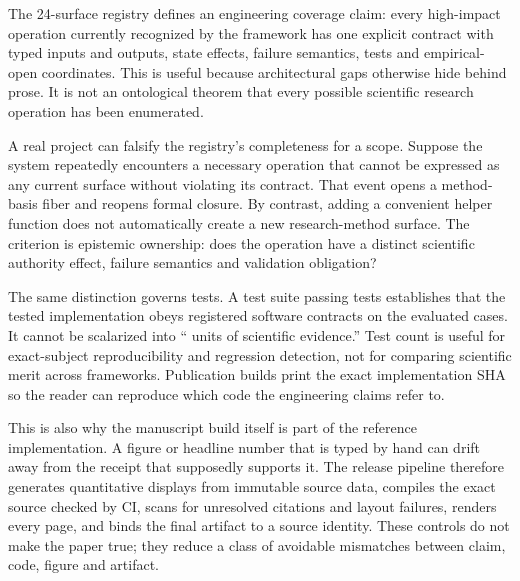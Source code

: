 The 24-surface registry defines an engineering coverage claim: every high-impact operation currently recognized by the framework has one explicit contract with typed inputs and outputs, state effects, failure semantics, tests and empirical-open coordinates. This is useful because architectural gaps otherwise hide behind prose. It is not an ontological theorem that every possible scientific research operation has been enumerated.

A real project can falsify the registry's completeness for a scope. Suppose the system repeatedly encounters a necessary operation that cannot be expressed as any current surface without violating its contract. That event opens a method-basis fiber and reopens formal closure. By contrast, adding a convenient helper function does not automatically create a new research-method surface. The criterion is epistemic ownership: does the operation have a distinct scientific authority effect, failure semantics and validation obligation?

The same distinction governs tests. A test suite passing \SoftwareTests{} tests establishes that the tested implementation obeys registered software contracts on the evaluated cases. It cannot be scalarized into ``\SoftwareTests{} units of scientific evidence.'' Test count is useful for exact-subject reproducibility and regression detection, not for comparing scientific merit across frameworks. Publication builds print the exact implementation SHA so the reader can reproduce which code the engineering claims refer to.

This is also why the manuscript build itself is part of the reference implementation. A figure or headline number that is typed by hand can drift away from the receipt that supposedly supports it. The release pipeline therefore generates quantitative displays from immutable source data, compiles the exact source checked by CI, scans for unresolved citations and layout failures, renders every page, and binds the final artifact to a source identity. These controls do not make the paper true; they reduce a class of avoidable mismatches between claim, code, figure and artifact.
